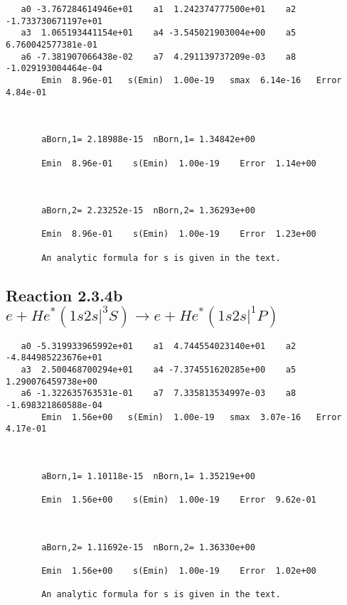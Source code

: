 \documentclass[12pt]{article}
\begin{document}
\begin{small}\begin{verbatim}
   a0 -3.767284614946e+01    a1  1.242374777500e+01    a2 -1.733730671197e+01
   a3  1.065193441154e+01    a4 -3.545021903004e+00    a5  6.760042577381e-01
   a6 -7.381907066438e-02    a7  4.291139737209e-03    a8 -1.029193004464e-04
       Emin  8.96e-01   s(Emin)  1.00e-19   smax  6.14e-16   Error  4.84e-01



       aBorn,1= 2.18988e-15  nBorn,1= 1.34842e+00

       Emin  8.96e-01    s(Emin)  1.00e-19    Error  1.14e+00



       aBorn,2= 2.23252e-15  nBorn,2= 1.36293e+00

       Emin  8.96e-01    s(Emin)  1.00e-19    Error  1.23e+00

       An analytic formula for s is given in the text.
\end{verbatim}\end{small}




                             


\newpage
\subsection{
Reaction 2.3.4b $e + He^*(1s2s|^3S) \rightarrow e + He^*(1s2s|^1P)$}

















\begin{small}\begin{verbatim}
   a0 -5.319933965992e+01    a1  4.744554023140e+01    a2 -4.844985223676e+01
   a3  2.500468700294e+01    a4 -7.374551620285e+00    a5  1.290076459738e+00
   a6 -1.322635763531e-01    a7  7.335813534997e-03    a8 -1.698321860588e-04
       Emin  1.56e+00   s(Emin)  1.00e-19   smax  3.07e-16   Error  4.17e-01



       aBorn,1= 1.10118e-15  nBorn,1= 1.35219e+00

       Emin  1.56e+00    s(Emin)  1.00e-19    Error  9.62e-01



       aBorn,2= 1.11692e-15  nBorn,2= 1.36330e+00

       Emin  1.56e+00    s(Emin)  1.00e-19    Error  1.02e+00

       An analytic formula for s is given in the text.
\end{verbatim}\end{small}
\end{document}
